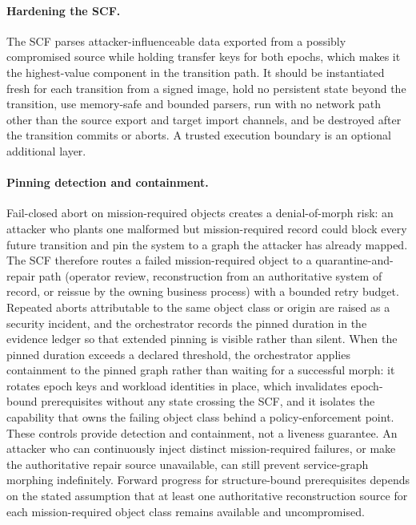 \documentclass[11pt,letterpaper]{article}
\begin{document}
\paragraph{Hardening the SCF.} The SCF parses attacker-influenceable data exported from a possibly compromised source while holding transfer keys for both epochs, which makes it the highest-value component in the transition path. It should be instantiated fresh for each transition from a signed image, hold no persistent state beyond the transition, use memory-safe and bounded parsers, run with no network path other than the source export and target import channels, and be destroyed after the transition commits or aborts. A trusted execution boundary is an optional additional layer.

\paragraph{Pinning detection and containment.} Fail-closed abort on mission-required objects creates a denial-of-morph risk: an attacker who plants one malformed but mission-required record could block every future transition and pin the system to a graph the attacker has already mapped. The SCF therefore routes a failed mission-required object to a quarantine-and-repair path (operator review, reconstruction from an authoritative system of record, or reissue by the owning business process) with a bounded retry budget. Repeated aborts attributable to the same object class or origin are raised as a security incident, and the orchestrator records the pinned duration in the evidence ledger so that extended pinning is visible rather than silent. When the pinned duration exceeds a declared threshold, the orchestrator applies containment to the pinned graph rather than waiting for a successful morph: it rotates epoch keys and workload identities in place, which invalidates epoch-bound prerequisites without any state crossing the SCF, and it isolates the capability that owns the failing object class behind a policy-enforcement point. These controls provide detection and containment, not a liveness guarantee. An attacker who can continuously inject distinct mission-required failures, or make the authoritative repair source unavailable, can still prevent service-graph morphing indefinitely. Forward progress for structure-bound prerequisites depends on the stated assumption that at least one authoritative reconstruction source for each mission-required object class remains available and uncompromised.
\end{document}
